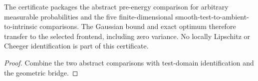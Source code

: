 \begin{theorem}
  \label{cert:legacy-relaxed-comparison}
  \leanok
  The certificate packages the abstract pre-energy comparison for arbitrary measurable
  probabilities and the five finite-dimensional smooth-test-to-ambient-to-intrinsic comparisons.
  The Gaussian bound and exact optimum therefore transfer to the selected frontend, including
  zero variance. No locally Lipschitz or Cheeger identification is part of this certificate.
\end{theorem}
\begin{proof}
  \leanok
  Combine the two abstract comparisons with test-domain identification and the geometric bridge.
\end{proof}
